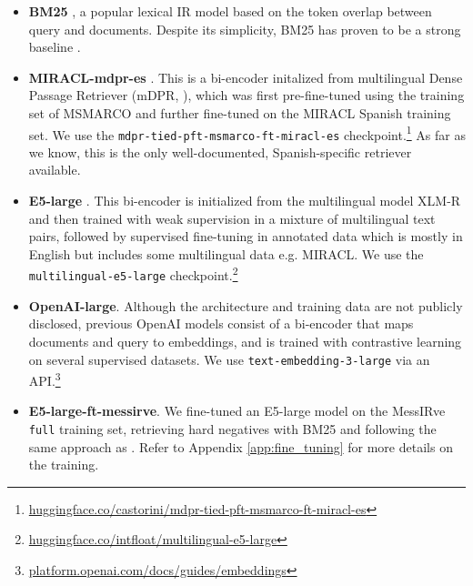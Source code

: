 \documentclass[11pt]{article}
\begin{document}
\begin{itemize}[wide, itemindent=, itemsep=0pt]

  \item \textbf{BM25} \citep{robertson1994okapi}, a popular lexical IR model based on the token overlap between query and documents. Despite its simplicity, BM25 has proven to be a strong baseline \citep{thakur2021beir}.

  \item \textbf{MIRACL-mdpr-es} \citep{zhang2023miracl}. This is a bi-encoder initalized from multilingual Dense Passage Retriever (mDPR, \citealp{zhang-etal-2021-mr}), which was first pre-fine-tuned using the training set of MSMARCO and further fine-tuned on the MIRACL Spanish training set. We use the \texttt{mdpr-tied-pft-msmarco-ft-miracl-es} checkpoint.\footnote{\href{https://huggingface.co/castorini/mdpr-tied-pft-msmarco-ft-miracl-es}{huggingface.co/castorini/mdpr-tied-pft-msmarco-ft-miracl-es}} As far as we know, this is the only well-documented, Spanish-specific retriever available.

  \item \textbf{E5-large} \citep{wang2024multilingual}. This bi-encoder is initialized from the multilingual model XLM-R \citep{conneau-etal-2020-unsupervised} and then trained with weak supervision in a mixture of multilingual text pairs, followed by supervised fine-tuning in annotated data which is mostly in English but includes some multilingual data e.g. MIRACL. We use the \texttt{multilingual-e5-large} checkpoint.\footnote{\href{https://huggingface.co/intfloat/multilingual-e5-large}{huggingface.co/intfloat/multilingual-e5-large}}

  \item \textbf{OpenAI-large}. Although the architecture and training data are not publicly disclosed, previous OpenAI models \citep{neelakantan2022text} consist of a bi-encoder that maps documents and query to embeddings, and is trained with contrastive learning on several supervised datasets. We use \texttt{text-embedding-3-large}  via an API.\footnote{\href{https://platform.openai.com/docs/guides/embeddings}{platform.openai.com/docs/guides/embeddings}}

  \item \textbf{E5-large-ft-messirve}. We fine-tuned an E5-large model on the MessIRve \texttt{full} training set, retrieving hard negatives with BM25 and following the same approach as \citet{wang2024multilingual}. Refer to Appendix \ref{app:fine_tuning} for more details on the training.

\end{itemize}
\end{document}
